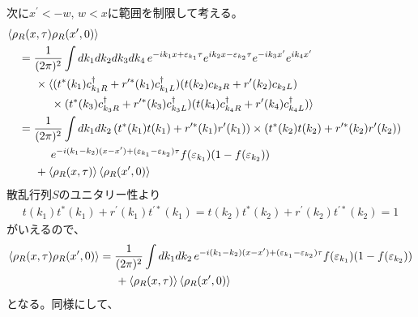 \documentclass[10pt,a4j]{jarticle}
\begin{document}
次に$x^\prime<-w$, $w<x$に範囲を制限して考える。
\begin{align}
& \hspace{-4mm} \braket{\rho_{R}(x,\tau) \rho_{R}(x^\prime,0)} \nonumber \\
& = \frac{1}{(2\pi)^2} \int dk_1 dk_2 dk_3 dk_4 \,
e^{-ik_1x+\varepsilon_{k_1}\tau}e^{ik_2x-\varepsilon_{k_2}\tau}e^{-ik_3x^\prime}e^{ik_4x^\prime} \nonumber \\
& \hspace{5mm} \times \langle (t^{*} (k_1)c^\dagger_{k_1R} + r^{\prime*}(k_1) c^\dagger_{k_1L}) 
 (t(k_2) c_{k_2R} + r^\prime(k_2) c_{k_2L}) \nonumber \\
& \hspace{10mm} \times
(t^{*} (k_3)c^\dagger_{k_3R} + r^{\prime*}(k_3) c^\dagger_{k_3L}) 
(t(k_4)c^\dagger_{k_4R} + r^{\prime}(k_4) c^\dagger_{k_4L}) \rangle  \nonumber \\
& =  \frac{1}{(2\pi)^2} \int dk_1 dk_2 \,
( t^{*}(k_1)t(k_1) + r^{\prime*}(k_1)r^\prime(k_1) )\times ( t^{*}(k_2)t(k_2) + r^{\prime*}(k_2)r^\prime(k_2) ) \nonumber \\
& \hspace{10mm} e^{-i(k_1-k_2)(x-x^\prime) + (\varepsilon_{k_1} - \varepsilon_{k_2})\tau}
f(\varepsilon_{k_1})(1 - f(\varepsilon_{k_2})) \nonumber \\
& \hspace{5mm} + \braket{\rho_{R}(x,\tau)}  \braket{ \rho_{R}(x^\prime,0)}  
\end{align}
散乱行列$S$のユニタリー性より
\begin{align}
t(k_1)t^*(k_1) +  r^\prime(k_1) t^{\prime*}(k_1)  = t(k_2)t^*(k_2) +  r^\prime(k_2) t^{\prime*}(k_2) = 1
\end{align}
がいえるので、
\begin{align}
\braket{\rho_{R}(x,\tau) \rho_{R}(x^\prime,0)}
& =  \frac{1}{(2\pi)^2} \int dk_1 dk_2 \, e^{-i(k_1-k_2)(x-x^\prime) + (\varepsilon_{k_1} - \varepsilon_{k_2})\tau}
f(\varepsilon_{k_1})(1 - f(\varepsilon_{k_2})) \nonumber \\
& \hspace{5mm} + \braket{\rho_{R}(x,\tau)}  \braket{ \rho_{R}(x^\prime,0)}  
\end{align}
となる。同様にして、
\end{document}
